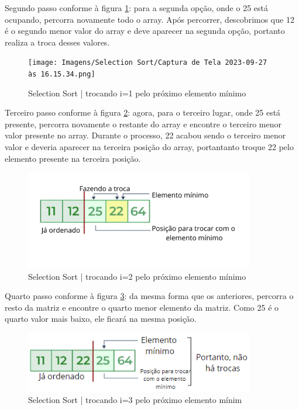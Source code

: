 \par Segundo passo conforme à figura \ref{fig:exemplo2}: para a segunda opção, onde o 25 está ocupando, percorra novamente todo o array. Após percorrer, descobrimos que 12 é o segundo menor valor do array e deve aparecer na segunda opção, portanto realiza a troca desses valores.

\begin{figure}[h!]
    \centering
    \texttt{[image: Imagens/Selection Sort/Captura de Tela 2023-09-27 às 16.15.34.png]}
    \caption{Selection Sort | trocando i=1 pelo próximo elemento mínimo}
    \label{fig:exemplo2}
\end{figure}
\newpage
\par Terceiro passo conforme à figura \ref{fig:exemplo3}: agora, para o terceiro lugar, onde 25 está presente, percorra novamente o restante do array e encontre o terceiro menor valor presente no array. Durante o processo, 22 acabou sendo o terceiro menor valor e deveria aparecer na terceira posição do array, portantanto troque 22 pelo elemento presente na terceira posição.

\begin{figure}[h!]
    \centering
    \includegraphics[width = 10cm]{Imagens/Selection Sort/image1.png}
    \caption{Selection Sort | trocando i=2 pelo próximo elemento mínimo}
    \label{fig:exemplo3}
\end{figure}

\par Quarto passo conforme à figura \ref{fig:exemplo4}: da mesma forma que os anteriores, percorra o resto da matriz e encontre o quarto menor elemento da matriz. Como 25 é o quarto valor mais baixo, ele ficará na mesma posição.

\begin{figure}[h!]
    \centering
    \includegraphics[width = 10cm]{Imagens/Selection Sort/image2.png}
    \caption{Selection Sort | trocando i=3 pelo próximo elemento mínim}
    \label{fig:exemplo4}
\end{figure}

